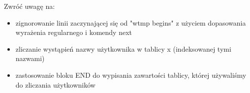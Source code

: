\noindent Zwróć uwagę na:
\begin{itemize}
\item zignorowanie linii zaczynającej się od "wtmp begins" z użyciem dopasowania wyrażenia regularnego i komendy next
\item zliczanie wystąpień nazwy użytkownika w tablicy x (indeksowanej tymi nazwami)
\item zastosowanie bloku END do wypisania zawartości tablicy, której używaliśmy do zliczania użytkowników
\end{itemize}
\fi
